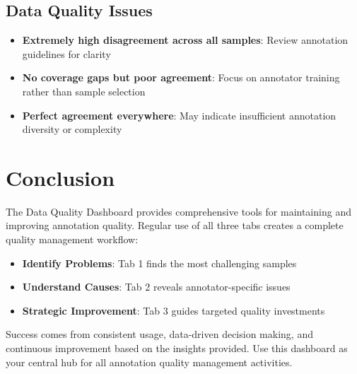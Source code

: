 \documentclass[11pt]{article}
\begin{document}
\subsection{Data Quality Issues}
\begin{itemize}
\item \textbf{Extremely high disagreement across all samples}: Review annotation guidelines for clarity
\item \textbf{No coverage gaps but poor agreement}: Focus on annotator training rather than sample selection
\item \textbf{Perfect agreement everywhere}: May indicate insufficient annotation diversity or complexity
\end{itemize}

\section{Conclusion}

The Data Quality Dashboard provides comprehensive tools for maintaining and improving annotation quality. Regular use of all three tabs creates a complete quality management workflow:

\begin{itemize}
\item \textbf{Identify Problems}: Tab 1 finds the most challenging samples
\item \textbf{Understand Causes}: Tab 2 reveals annotator-specific issues  
\item \textbf{Strategic Improvement}: Tab 3 guides targeted quality investments
\end{itemize}

Success comes from consistent usage, data-driven decision making, and continuous improvement based on the insights provided. Use this dashboard as your central hub for all annotation quality management activities.
\end{document}

